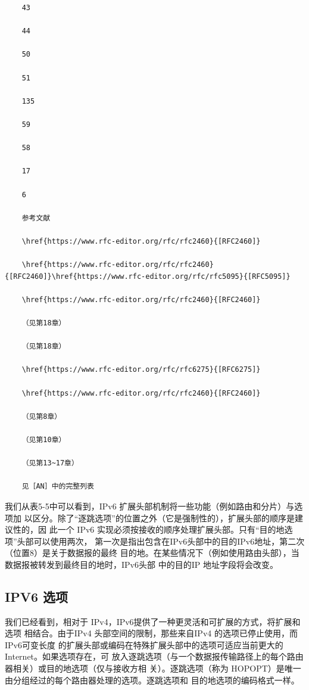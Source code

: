 \begin{verbatim}
    43

    44

    50

    51

    135

    59

    58

    17

    6

    参考文献

    \href{https://www.rfc-editor.org/rfc/rfc2460}{[RFC2460]}

    \href{https://www.rfc-editor.org/rfc/rfc2460}{[RFC2460]}\href{https://www.rfc-editor.org/rfc/rfc5095}{[RFC5095]}

    \href{https://www.rfc-editor.org/rfc/rfc2460}{[RFC2460]}

    （见第18章）

    （见第18章）

    \href{https://www.rfc-editor.org/rfc/rfc6275}{[RFC6275]}

    \href{https://www.rfc-editor.org/rfc/rfc2460}{[RFC2460]}

    （见第8章）

    （见第10章）

    （见第13~17章）

    见［AN］中的完整列表
\end{verbatim}

我们从表5-5中可以看到，IPv6 扩展头部机制将一些功能（例如路由和分片）与选项加
以区分。除了“逐跳选项”的位置之外（它是强制性的），扩展头部的顺序是建议性的，因
此一个 IPv6 实现必须按接收的顺序处理扩展头部。只有“目的地选项”头部可以使用两次，
第一次是指出包含在IPv6头部中的目的IPv6地址，第二次（位置8）是关于数据报的最终
目的地。在某些情况下（例如使用路由头部），当数据报被转发到最终目的地时，IPv6头部
中的目的IP 地址字段将会改变。

\subsection{IPV6 选项}

我们已经看到，相对于 IPv4，IPv6提供了一种更灵活和可扩展的方式，将扩展和选项
相结合。由于IPv4 头部空间的限制，那些来自IPv4 的选项已停止使用，而IPv6可变长度
的扩展头部或编码在特殊扩展头部中的选项可适应当前更大的 Internet。如果选项存在，可
放入逐跳选项（与一个数据报传输路径上的每个路由器相关）或目的地选项（仅与接收方相
关）。逐跳选项（称为 HOPOPT）是唯一由分组经过的每个路由器处理的选项。逐跳选项和
目的地选项的编码格式一样。

